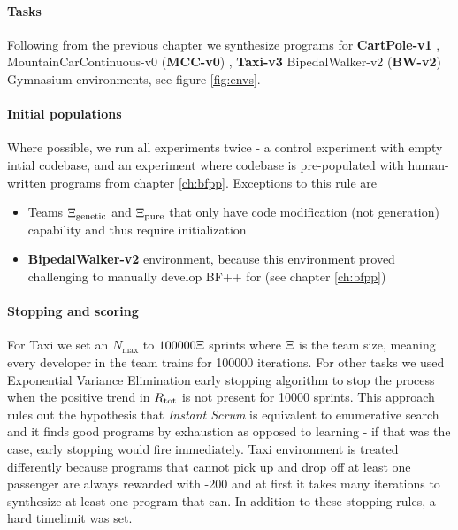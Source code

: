 \paragraph{Tasks}
\label{sec:tasks}

Following from the previous chapter we synthesize programs for \textbf{CartPole-v1} \cite{cartpole}, MountainCarContinuous-v0 (\textbf{MCC-v0}) \cite{mountain_car}, \textbf{Taxi-v3} \cite{taxi} BipedalWalker-v2 (\textbf{BW-v2})  Gymnasium \cite{towersGymnasiumStandardInterface2024} environments, see figure \ref{fig:envs}.

\paragraph{Initial populations}

Where possible, we run all experiments twice - a control experiment with empty intial codebase, and an experiment where codebase is pre-populated with human-written programs from chapter \ref{ch:bfpp}.
Exceptions to this rule are 
\begin{itemize}
    \item Teams $\Xi_\text{genetic}$ and $\Xi_\text{pure}$ that only have code modification (not generation) capability and thus require initialization 
    \item \textbf{BipedalWalker-v2} environment, because this environment proved challenging to manually develop BF++ for (see chapter \ref{ch:bfpp})
\end{itemize}

\paragraph{Stopping and scoring}

For Taxi we set an $N_\text{max}$ to $100000 \Xi$ sprints where $\Xi$ is the team size, meaning every developer in the team trains for 100000 iterations.
For other tasks we used Exponential Variance Elimination \cite{evestop} early stopping algorithm to stop the process when the positive trend in $R_\text{tot}$ is not present for 10000 sprints.
This approach rules out the hypothesis that \emph{Instant Scrum} is equivalent to enumerative search and it finds good programs by exhaustion as opposed to learning - if that was the case, early stopping would fire immediately.
Taxi environment is treated differently because programs that cannot pick up and drop off at least one passenger are always rewarded with -200 and at first it takes many iterations to synthesize at least one program that can.
In addition to these stopping rules, a hard timelimit was set.

